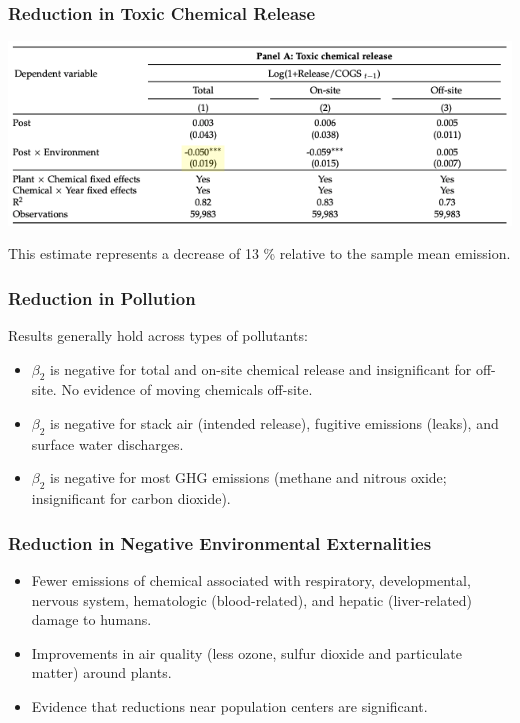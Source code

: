 \documentclass{beamer}
\begin{document}
\begin{frame}
\frametitle{Reduction in Toxic Chemical Release}
{
\centering
\includegraphics[scale=0.45]{pollution_table}
}
\bigskip

This estimate represents a decrease of 13 \% relative to the sample mean emission.
\end{frame}


\begin{frame}
\frametitle{Reduction in Pollution}

Results generally hold across types of pollutants:

\bigskip

\begin{itemize}[<+->]
\item $\beta_2$ is negative for total and on-site chemical release and insignificant for off-site. No evidence of moving chemicals off-site.
\bigskip
\item $\beta_2$ is negative for stack air (intended release), fugitive emissions (leaks), and surface water discharges.
\bigskip
\item $\beta_2$ is negative for most GHG emissions (methane and nitrous oxide; insignificant for carbon dioxide).
\end{itemize}
\end{frame}


\begin{frame}
\frametitle{Reduction in Negative Environmental Externalities}
\begin{itemize}[<+->]

\item Fewer emissions of chemical associated with respiratory, developmental, nervous system, hematologic (blood-related), and hepatic (liver-related) damage to humans.
\bigskip
\item Improvements in air quality (less ozone, sulfur dioxide and particulate matter) around plants.
\bigskip
\item Evidence that reductions near population centers are significant.
\end{itemize}
\end{frame}
\end{document}
